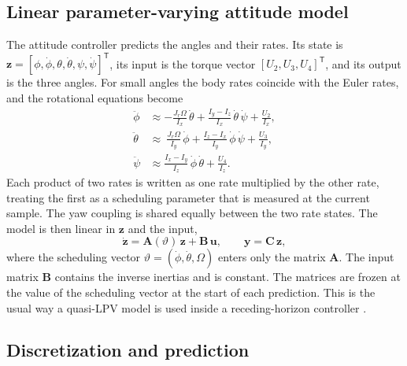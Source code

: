 \documentclass[11pt,a4paper]{article}
\numberwithin{equation}{section}
\newcommand{\vect}[1]{\mathbf{#1}}
\begin{document}
\subsection{Linear parameter-varying attitude model}

The attitude controller predicts the angles and their rates. Its state is $\vect{z}=[\phi,\dot\phi,\theta,\dot\theta,\psi,\dot\psi]^{\mathsf T}$, its input is the torque vector $[U_2,U_3,U_4]^{\mathsf T}$, and its output is the three angles. For small angles the body rates coincide with the Euler rates, and the rotational equations become
\begin{equation}
\begin{aligned}
\ddot\phi&\approx-\frac{J_r\Omega}{I_x}\,\dot\theta+\frac{I_y-I_z}{I_x}\,\dot\theta\,\dot\psi+\frac{U_2}{I_x},\\
\ddot\theta&\approx\ \frac{J_r\Omega}{I_y}\,\dot\phi+\frac{I_z-I_x}{I_y}\,\dot\phi\,\dot\psi+\frac{U_3}{I_y},\\
\ddot\psi&\approx\frac{I_x-I_y}{I_z}\,\dot\phi\,\dot\theta+\frac{U_4}{I_z}.
\end{aligned}
\end{equation}
Each product of two rates is written as one rate multiplied by the other rate, treating the first as a scheduling parameter that is measured at the current sample. The yaw coupling is shared equally between the two rate states. The model is then linear in $\vect{z}$ and the input,
\begin{equation}
\dot{\vect{z}}=\vect{A}(\vartheta)\,\vect{z}+\vect{B}\,\vect{u},\qquad
\vect{y}=\vect{C}\,\vect{z},
\end{equation}
where the scheduling vector $\vartheta=(\dot\phi,\dot\theta,\Omega)$ enters only the matrix $\vect{A}$. The input matrix $\vect{B}$ contains the inverse inertias and is constant. The matrices are frozen at the value of the scheduling vector at the start of each prediction. This is the usual way a quasi-LPV model is used inside a receding-horizon controller \cite{shamma1990,briat2015}.

\subsection{Discretization and prediction}
\end{document}
